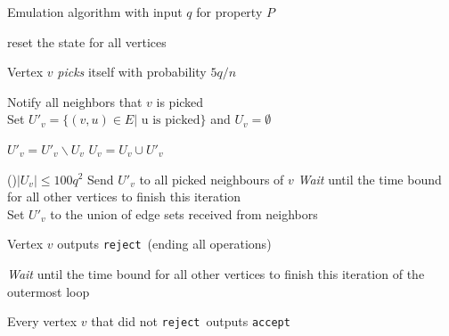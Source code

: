 \documentclass[11pt]{article}
\newcommand{\accept}{\texttt{accept}}
\newcommand{\reject}{\texttt{reject}}
\begin{document}
\begin{algorithm}[htbp]
\caption{Emulation algorithm with input $q$ for property $P$
\label{alg:simulate-test}}
{
	reset the state for all vertices\\
			
	{
Vertex $v$ \textit{picks} itself with probability $5q/n$\\
		{
			Notify all neighbors that $v$ is picked\\
			Set $U'_v = \{(v,u) \in E | \text{  u is picked}\}$ and $U_v=\emptyset$\\
					
			{
				$U'_v = U'_v \backslash U_v$ 
				$U_v = U_v\cup U'_v$ 
						
				\If(){$|U_v|\leq 100q^2$}
				{
					Send $U'_v$ to all picked neighbours of $v$ 
				}
				\textit{Wait} until the time bound for all other vertices to finish this iteration\\
				Set $U'_v$ to the union of edge sets received from neighbors
			}
			{
				Vertex $v$ outputs \reject ~(ending all operations)
			}
		}
		\Else
		{
			\textit{Wait} until the time bound for all other vertices to finish this iteration of the outermost loop
		}
	}
}
Every vertex $v$ that did not \reject~outputs \accept

\end{algorithm}
	
	
	
\end{document}

